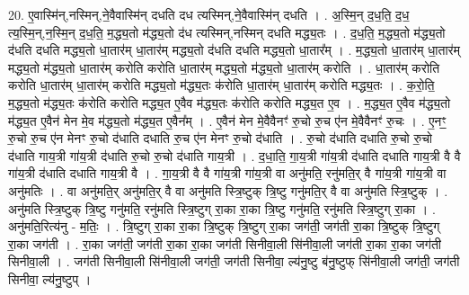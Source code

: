 \documentclass[17pt]{extarticle}
\begin{document}
20. ए॒वास्मि॑न्,नस्मिन्,ने॒वैवास्मि॑न् दधति दध त्यस्मिन्,ने॒वैवास्मि॑न् दधति । . अ॒स्मि॒न् द॒ध॒ति॒ द॒ध॒ त्य॒स्मि॒न्,न॒स्मि॒न् द॒ध॒ति॒ म॒द्ध्य॒तो म॑द्ध्य॒तो द॑ध त्यस्मिन्,नस्मिन् दधति मद्ध्य॒तः । . द॒ध॒ति॒ म॒द्ध्य॒तो म॑द्ध्य॒तो द॑धति दधति मद्ध्य॒तो धा॒तार॑म् धा॒तार॑म् मद्ध्य॒तो द॑धति 
दधति मद्ध्य॒तो धा॒तार᳚म् । . म॒द्ध्य॒तो धा॒तार॑म् धा॒तार॑म् मद्ध्य॒तो म॑द्ध्य॒तो धा॒तार॑म् करोति करोति धा॒तार॑म् मद्ध्य॒तो म॑द्ध्य॒तो धा॒तार॑म् करोति । . धा॒तार॑म् करोति करोति धा॒तार॑म् धा॒तार॑म् करोति मद्ध्य॒तो म॑द्ध्य॒तः क॑रोति धा॒तार॑म् धा॒तार॑म् करोति मद्ध्य॒तः । . क॒रो॒ति॒ म॒द्ध्य॒तो म॑द्ध्य॒तः क॑रोति करोति मद्ध्य॒त ए॒वैव म॑द्ध्य॒तः क॑रोति करोति मद्ध्य॒त ए॒व । . म॒द्ध्य॒त ए॒वैव म॑द्ध्य॒तो म॑द्ध्य॒त ए॒वैन॑ मेन मे॒व म॑द्ध्य॒तो म॑द्ध्य॒त ए॒वैन᳚म् । . ए॒वैन॑ मेन मे॒वैवैनꣳ॑ रु॒चो रु॒च ए॑न मे॒वैवैनꣳ॑ रु॒चः । . ए॒नꣳ॒॒ रु॒चो रु॒च ए॑न मेनꣳ रु॒चो द॑धाति दधाति रु॒च ए॑न मेनꣳ रु॒चो द॑धाति । . रु॒चो द॑धाति दधाति रु॒चो रु॒चो द॑धाति गाय॒त्री गा॑य॒त्री द॑धाति रु॒चो रु॒चो द॑धाति गाय॒त्री । . द॒धा॒ति॒ गा॒य॒त्री गा॑य॒त्री द॑धाति दधाति गाय॒त्री वै वै गा॑य॒त्री द॑धाति दधाति गाय॒त्री वै । . गा॒य॒त्री वै वै गा॑य॒त्री गा॑य॒त्री वा अनु॑मति॒ रनु॑मति॒र् वै गा॑य॒त्री गा॑य॒त्री वा अनु॑मतिः । . वा अनु॑मति॒र् अनु॑मति॒र् वै वा अनु॑मति स्त्रि॒ष्टुक् त्रि॒ष्टु गनु॑मति॒र् वै वा अनु॑मति स्त्रि॒ष्टुक् । . अनु॑मति स्त्रि॒ष्टुक् त्रि॒ष्टु गनु॑मति॒ रनु॑मति स्त्रि॒ष्टुग् रा॒का रा॒का त्रि॒ष्टु गनु॑मति॒ रनु॑मति स्त्रि॒ष्टुग् रा॒का । . अनु॑मति॒रित्य॑नु - म॒तिः॒ । . त्रि॒ष्टुग् रा॒का रा॒का त्रि॒ष्टुक् त्रि॒ष्टुग् रा॒का जग॑ती॒ जग॑ती रा॒का त्रि॒ष्टुक् त्रि॒ष्टुग् रा॒का जग॑ती । . रा॒का जग॑ती॒ जग॑ती रा॒का रा॒का जग॑ती सिनीवा॒ली सि॑नीवा॒ली जग॑ती रा॒का रा॒का जग॑ती सिनीवा॒ली । . जग॑ती सिनीवा॒ली सि॑नीवा॒ली जग॑ती॒ जग॑ती सिनीवा॒ ल्य॑नु॒ष्टु ब॑नु॒ष्टुफ् सि॑नीवा॒ली जग॑ती॒ जग॑ती सिनीवा॒ ल्य॑नु॒ष्टुप् । \newline
\end{document}
